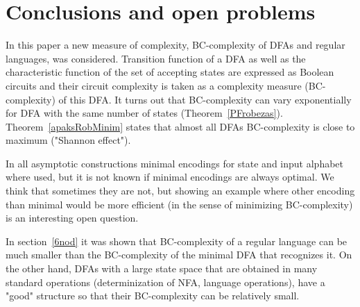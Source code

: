 \documentclass[copyright, creativecommons]{eptcs}
\begin{document}
\section{Conclusions and open problems}
\label{7nod}
In this paper a new measure of complexity, BC-complexity of DFAs and regular languages, was considered.
Transition function of a DFA as well as the characteristic function of the set of accepting states are expressed
as Boolean circuits and their circuit complexity is taken as a complexity measure (BC-complexity) of this DFA.
It turns out that BC-complexity can vary exponentially for DFA with the same number of states (Theorem~\ref{PFrobezas}).
Theorem~\ref{apaksRobMinim} states that almost all DFAs
BC-complexity is close to maximum ("Shannon effect"). 

In all asymptotic  constructions minimal encodings for state and input alphabet where used,
but it is not known if minimal encodings are always optimal. We think that sometimes they are not, but showing
an example where other encoding
than minimal would be more
efficient (in the sense of minimizing BC-complexity) is an interesting open question.


In section~\ref{6nod} it was shown that BC-complexity of a regular language can be much smaller
than the BC-complexity of the minimal DFA that recognizes it.
On the other hand, DFAs with a large state space that are obtained in many standard operations
(determinization of NFA, language operations), have a "good" structure so
that their BC-complexity can be relatively small.



\nocite{*}


\end{document}
